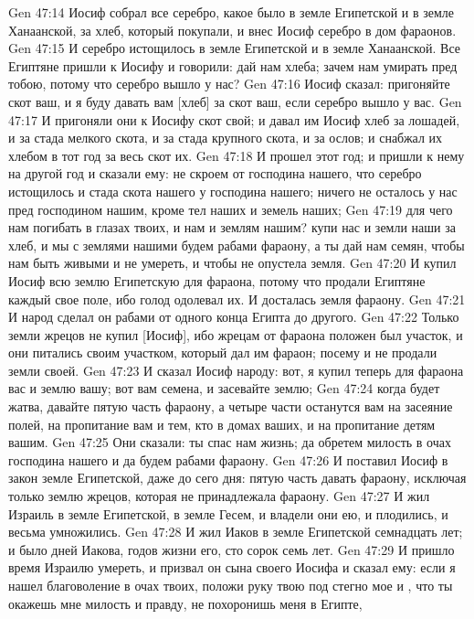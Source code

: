 \vs Gen 47:14 Иосиф собрал все серебро, какое было в земле Египетской и в земле Ханаанской, за хлеб, который покупали, и внес Иосиф серебро в дом фараонов.
\vs Gen 47:15 И серебро истощилось в земле Египетской и в земле Ханаанской. Все Египтяне пришли к Иосифу и говорили: дай нам хлеба; зачем нам умирать пред тобою, потому что серебро вышло у нас?
\vs Gen 47:16 Иосиф сказал: пригоняйте скот ваш, и я буду давать вам [хлеб] за скот ваш, если серебро вышло у вас.
\vs Gen 47:17 И пригоняли они к Иосифу скот свой; и давал им Иосиф хлеб за лошадей, и за стада мелкого скота, и за стада крупного скота, и за ослов; и снабжал их хлебом в тот год за весь скот их.
\vs Gen 47:18 И прошел этот год; и пришли к нему на другой год и сказали ему: не скроем от господина нашего, что серебро истощилось и стада скота нашего у господина нашего; ничего не осталось у нас пред господином нашим, кроме тел наших и земель наших;
\vs Gen 47:19 для чего нам погибать в глазах твоих, и нам и землям нашим? купи нас и земли наши за хлеб, и мы с землями нашими будем рабами фараону, а ты дай нам семян, чтобы нам быть живыми и не умереть, и чтобы не опустела земля.
\vs Gen 47:20 И купил Иосиф всю землю Египетскую для фараона, потому что продали Египтяне каждый свое поле, ибо голод одолевал их. И досталась земля фараону.
\vs Gen 47:21 И народ сделал он рабами от одного конца Египта до другого.
\vs Gen 47:22 Только земли жрецов не купил [Иосиф], ибо жрецам от фараона положен был участок, и они питались своим участком, который дал им фараон; посему и не продали земли своей.
\vs Gen 47:23 И сказал Иосиф народу: вот, я купил теперь для фараона вас и землю вашу; вот вам семена, и засевайте землю;
\vs Gen 47:24 когда будет жатва, давайте пятую часть фараону, а четыре части останутся вам на засеяние полей, на пропитание вам и тем, кто в домах ваших, и на пропитание детям вашим.
\vs Gen 47:25 Они сказали: ты спас нам жизнь; да обретем милость в очах господина нашего и да будем рабами фараону.
\vs Gen 47:26 И поставил Иосиф в закон земле Египетской, даже до сего дня: пятую часть давать фараону, исключая только землю жрецов, которая не принадлежала фараону.
\rsbpar\vs Gen 47:27 И жил Израиль в земле Египетской, в земле Гесем, и владели они ею, и плодились, и весьма умножились.
\vs Gen 47:28 И жил Иаков в земле Египетской семнадцать лет; и было дней Иакова, годов жизни его, сто сорок семь лет.
\vs Gen 47:29 И пришло время Израилю умереть, и призвал он сына своего Иосифа и сказал ему: если я нашел благоволение в очах твоих, положи руку твою под стегно мое и , что ты окажешь мне милость и правду, не похоронишь меня в Египте,
